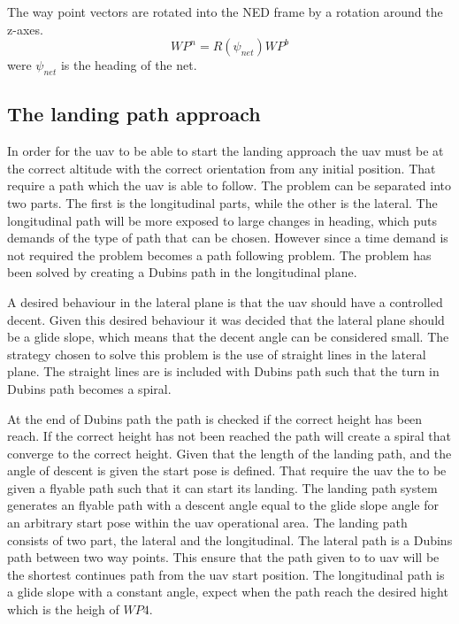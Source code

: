 The way point vectors are rotated into the NED frame by a rotation around the z-axes.
\begin{equation}
WP^n = R(\psi_{net})WP^b
\end{equation}
were $\psi_{net}$ is the heading of the net.
\begin{figure}
\def\svgwidth{\textwidth} %

\end{figure}

\subsection{The landing path approach}
In order for the \gls{uav} to be able to start the landing approach the \gls{uav} must be at the correct altitude with the correct orientation from any initial position. That require a path which the \gls{uav} is able to follow. The problem can be separated into two parts. The first is the longitudinal parts, while the other is the lateral. The longitudinal path will be more exposed to large changes in heading, which puts demands of the type of path that can be chosen. However since a time demand is not required the problem becomes a path following problem. The problem has been solved by creating a Dubins path in the longitudinal plane.

A desired behaviour in the lateral plane is that the \gls{uav} should have a controlled decent. Given this desired behaviour it was decided that the lateral plane should be a glide slope, which means that the decent angle can be considered small. The strategy chosen to solve this problem is the use of straight lines in the lateral plane. The straight lines are is included with Dubins path such that the turn in Dubins path becomes a spiral.

At the end of Dubins path the path is checked if the correct height has been reach. If the correct height has not been reached the path will create a spiral that converge to the correct height.
Given that the length of the landing path, and the angle of descent is given the start pose is defined. That require the uav the to be given a flyable path such that it can start its landing. The landing path system generates an flyable path with a descent angle equal to the glide slope angle for an arbitrary start pose within the uav operational area. The landing path consists of two part, the lateral and the longitudinal. The lateral path is a Dubins path between two way points. This ensure that the path given to to uav will be the shortest continues path from the uav start position. The longitudinal path is a glide slope with a constant angle, expect when the path reach the desired hight which is the heigh of $WP4$.

